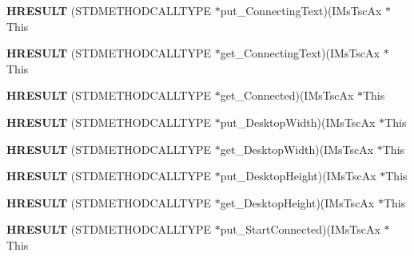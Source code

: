 \begin{DoxyCompactItemize}
\item 
\mbox{\label{struct_i_ms_tsc_ax_vtbl_ab57ab6ba0a629812dd1c43cfda64b1ad}} 
{\bfseries H\+R\+E\+S\+U\+LT} (S\+T\+D\+M\+E\+T\+H\+O\+D\+C\+A\+L\+L\+T\+Y\+PE $\ast$put\+\_\+\+Connecting\+Text)(I\+Ms\+Tsc\+Ax $\ast$This
\item 
\mbox{\label{struct_i_ms_tsc_ax_vtbl_a6a93240ea07ef8a9b0ceeb53e7dbca75}} 
{\bfseries H\+R\+E\+S\+U\+LT} (S\+T\+D\+M\+E\+T\+H\+O\+D\+C\+A\+L\+L\+T\+Y\+PE $\ast$get\+\_\+\+Connecting\+Text)(I\+Ms\+Tsc\+Ax $\ast$This
\item 
\mbox{\label{struct_i_ms_tsc_ax_vtbl_a9d630ef1fad7ddb44b44b32a00a09e74}} 
{\bfseries H\+R\+E\+S\+U\+LT} (S\+T\+D\+M\+E\+T\+H\+O\+D\+C\+A\+L\+L\+T\+Y\+PE $\ast$get\+\_\+\+Connected)(I\+Ms\+Tsc\+Ax $\ast$This
\item 
\mbox{\label{struct_i_ms_tsc_ax_vtbl_acbd98f8783d9fc3c87d9ea9bc0ae51ad}} 
{\bfseries H\+R\+E\+S\+U\+LT} (S\+T\+D\+M\+E\+T\+H\+O\+D\+C\+A\+L\+L\+T\+Y\+PE $\ast$put\+\_\+\+Desktop\+Width)(I\+Ms\+Tsc\+Ax $\ast$This
\item 
\mbox{\label{struct_i_ms_tsc_ax_vtbl_aad3440b79e369dad9bb7bb5cf9d356fb}} 
{\bfseries H\+R\+E\+S\+U\+LT} (S\+T\+D\+M\+E\+T\+H\+O\+D\+C\+A\+L\+L\+T\+Y\+PE $\ast$get\+\_\+\+Desktop\+Width)(I\+Ms\+Tsc\+Ax $\ast$This
\item 
\mbox{\label{struct_i_ms_tsc_ax_vtbl_aa3fdd502e5044893dd1e343cdd5983ad}} 
{\bfseries H\+R\+E\+S\+U\+LT} (S\+T\+D\+M\+E\+T\+H\+O\+D\+C\+A\+L\+L\+T\+Y\+PE $\ast$put\+\_\+\+Desktop\+Height)(I\+Ms\+Tsc\+Ax $\ast$This
\item 
\mbox{\label{struct_i_ms_tsc_ax_vtbl_ad014df012a38258f6be676f4f2889bf3}} 
{\bfseries H\+R\+E\+S\+U\+LT} (S\+T\+D\+M\+E\+T\+H\+O\+D\+C\+A\+L\+L\+T\+Y\+PE $\ast$get\+\_\+\+Desktop\+Height)(I\+Ms\+Tsc\+Ax $\ast$This
\item 
\mbox{\label{struct_i_ms_tsc_ax_vtbl_adfff51e28a583f2d69befe3e978cb54f}} 
{\bfseries H\+R\+E\+S\+U\+LT} (S\+T\+D\+M\+E\+T\+H\+O\+D\+C\+A\+L\+L\+T\+Y\+PE $\ast$put\+\_\+\+Start\+Connected)(I\+Ms\+Tsc\+Ax $\ast$This

\end{DoxyCompactItemize}
